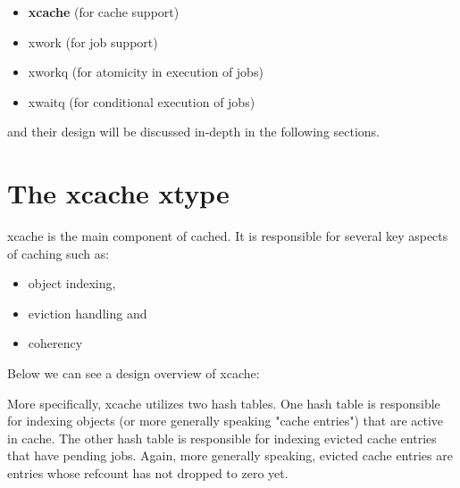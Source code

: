 \begin{comment}
More specifically, cached consists of the cache provided by xcache aasfs as safa
asfasfnd a
pre-allocated number of objects. An object is divided in buckets and its size,
as well as bucket size, are defined by the user.

The fact that objects are pre-allocated means two things:

1) We don't need to care about memory fragmentation and system call overhead
2) We cannot index single buckets. <FILLME>
\end{comment}

\begin{itemize}
	\item \textbf{xcache} (for cache support)
	\item xwork (for job support)
	\item xworkq (for atomicity in execution of jobs)
	\item xwaitq (for conditional execution of jobs)
\end{itemize}

and their design will be discussed in-depth in the following sections.

\section{The xcache xtype}

xcache is the main component of cached. It is responsible for several key 
aspects of caching such as:

\begin{itemize}
	\item object indexing,
	\item eviction handling and
	\item coherency
\end{itemize}

Below we can see a design overview of xcache:


More specifically, xcache utilizes two hash tables. One hash table is 
responsible for indexing objects (or more generally speaking "cache entries") 
that are active in cache.  The other hash table is responsible for indexing 
evicted cache entries that have pending jobs.  Again, more generally speaking, 
evicted cache entries are entries whose refcount has not dropped to zero yet.

